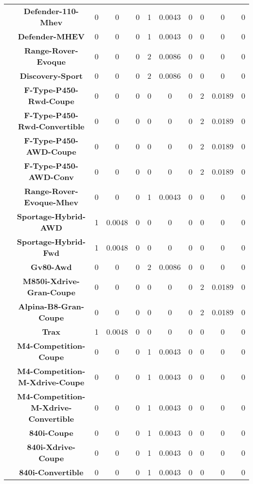 \begin{center}
\begin{tabular}{|c|c||@{\hspace{1ex}}||c|c|c||@{\hspace{1ex}}||c|c|c||@{\hspace{1ex}}||c|c|c||@{\hspace{1ex}}||}
\cline{2-11}
  & {\bf Defender-110-Mhev} & 0 & 0 & 0 & 1 & 0.0043 & 0 & 0 & 0 & 0 \\
\cline{2-11}
  & {\bf Defender-MHEV} & 0 & 0 & 0 & 1 & 0.0043 & 0 & 0 & 0 & 0 \\
\cline{2-11}
  & {\bf Range-Rover-Evoque} & 0 & 0 & 0 & 2 & 0.0086 & 0 & 0 & 0 & 0 \\
\cline{2-11}
  & {\bf Discovery-Sport} & 0 & 0 & 0 & 2 & 0.0086 & 0 & 0 & 0 & 0 \\
\cline{2-11}
  & {\bf F-Type-P450-Rwd-Coupe} & 0 & 0 & 0 & 0 & 0 & 0 & 2 & 0.0189 & 0 \\
\cline{2-11}
  & {\bf F-Type-P450-Rwd-Convertible} & 0 & 0 & 0 & 0 & 0 & 0 & 2 & 0.0189 & 0 \\
\cline{2-11}
  & {\bf F-Type-P450-AWD-Coupe} & 0 & 0 & 0 & 0 & 0 & 0 & 2 & 0.0189 & 0 \\
\cline{2-11}
  & {\bf F-Type-P450-AWD-Conv} & 0 & 0 & 0 & 0 & 0 & 0 & 2 & 0.0189 & 0 \\
\cline{2-11}
  & {\bf Range-Rover-Evoque-Mhev} & 0 & 0 & 0 & 1 & 0.0043 & 0 & 0 & 0 & 0 \\
\cline{2-11}
  & {\bf Sportage-Hybrid-AWD} & 1 & 0.0048 & 0 & 0 & 0 & 0 & 0 & 0 & 0 \\
\cline{2-11}
  & {\bf Sportage-Hybrid-Fwd} & 1 & 0.0048 & 0 & 0 & 0 & 0 & 0 & 0 & 0 \\
\cline{2-11}
  & {\bf Gv80-Awd} & 0 & 0 & 0 & 2 & 0.0086 & 0 & 0 & 0 & 0 \\
\cline{2-11}
  & {\bf M850i-Xdrive-Gran-Coupe} & 0 & 0 & 0 & 0 & 0 & 0 & 2 & 0.0189 & 0 \\
\cline{2-11}
  & {\bf Alpina-B8-Gran-Coupe} & 0 & 0 & 0 & 0 & 0 & 0 & 2 & 0.0189 & 0 \\
\cline{2-11}
  & {\bf Trax} & 1 & 0.0048 & 0 & 0 & 0 & 0 & 0 & 0 & 0 \\
\cline{2-11}
  & {\bf M4-Competition-Coupe} & 0 & 0 & 0 & 1 & 0.0043 & 0 & 0 & 0 & 0 \\
\cline{2-11}
  & {\bf M4-Competition-M-Xdrive-Coupe} & 0 & 0 & 0 & 1 & 0.0043 & 0 & 0 & 0 & 0 \\
\cline{2-11}
  & {\bf M4-Competition-M-Xdrive-Convertible} & 0 & 0 & 0 & 1 & 0.0043 & 0 & 0 & 0 & 0 \\
\cline{2-11}
  & {\bf 840i-Coupe} & 0 & 0 & 0 & 1 & 0.0043 & 0 & 0 & 0 & 0 \\
\cline{2-11}
  & {\bf 840i-Xdrive-Coupe} & 0 & 0 & 0 & 1 & 0.0043 & 0 & 0 & 0 & 0 \\
\cline{2-11}
  & {\bf 840i-Convertible} & 0 & 0 & 0 & 1 & 0.0043 & 0 & 0 & 0 & 0 \\

\end{tabular}
\end{center}
